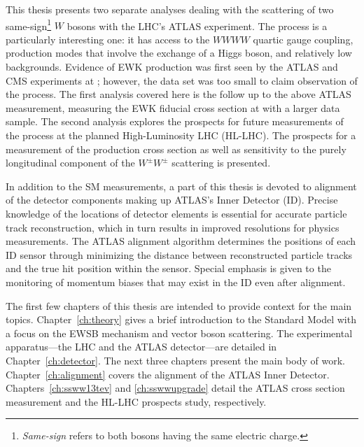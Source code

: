 This thesis presents two separate analyses dealing with the scattering of two same-sign\footnote{\emph{Same-sign} refers to both bosons having the same electric charge.} $W$ bosons with the LHC's ATLAS experiment.
The \ssww process is a particularly interesting one: it has access to the $WWWW$ quartic gauge coupling, production modes that involve the exchange of a Higgs boson, and relatively low backgrounds.
Evidence of EWK \ssww production was first seen by the ATLAS and CMS experiments at ; however, the data set was too small to claim observation of the process.
The first analysis covered here is the follow up to the above ATLAS measurement, measuring the EWK fiducial cross section at  with a larger data sample.
The second analysis explores the prospects for future measurements of the \ssww process at the planned High-Luminosity LHC (HL-LHC).
The prospects for a measurement of the production cross section as well as sensitivity to the purely longitudinal component of the $W^{\pm}W^{\pm}$ scattering is presented.

In addition to the SM measurements, a part of this thesis is devoted to alignment of the detector components making up ATLAS's Inner Detector (ID).
Precise knowledge of the locations of detector elements is essential for accurate particle track reconstruction, which in turn results in improved resolutions for physics measurements.
The ATLAS alignment algorithm determines the positions of each ID sensor through minimizing the distance between reconstructed particle tracks and the true hit position within the sensor.
Special emphasis is given to the monitoring of momentum biases that may exist in the ID even after alignment.

The first few chapters of this thesis are intended to provide context for the main topics.
Chapter~\ref{ch:theory} gives a brief introduction to the Standard Model with a focus on the EWSB mechanism and vector boson scattering.
The experimental apparatus---the LHC and the ATLAS detector---are detailed in Chapter~\ref{ch:detector}.
The next three chapters present the main body of work.
Chapter~\ref{ch:alignment} covers the alignment of the ATLAS Inner Detector.
Chapters~\ref{ch:ssww13tev} and \ref{ch:sswwupgrade} detail the ATLAS  \ssww cross section measurement and the  HL-LHC \ssww prospects study, respectively.

